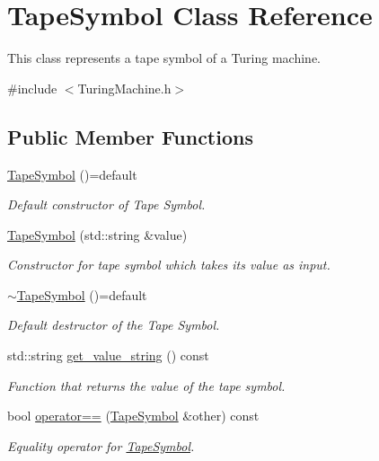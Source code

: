 \hypertarget{classTapeSymbol}{}\section{Tape\+Symbol Class Reference}
\label{classTapeSymbol}


This class represents a tape symbol of a Turing machine.  




{\ttfamily \#include $<$Turing\+Machine.\+h$>$}

\subsection*{Public Member Functions}
\begin{DoxyCompactItemize}
\item 
\mbox{\label{classTapeSymbol_a8b667065ca9dbb1840b6e5b940069214}} 
\hyperlink{classTapeSymbol_a8b667065ca9dbb1840b6e5b940069214}{Tape\+Symbol} ()=default
\begin{DoxyCompactList}\small\item\em Default constructor of Tape Symbol. \end{DoxyCompactList}\item 
\hyperlink{classTapeSymbol_ac4babc556460fd8d7da09115d9b19076}{Tape\+Symbol} (std\+::string \&value)
\begin{DoxyCompactList}\small\item\em Constructor for tape symbol which takes its value as input. \end{DoxyCompactList}\item 
\mbox{\label{classTapeSymbol_aa0474beea062da16777821736c788835}} 
\hyperlink{classTapeSymbol_aa0474beea062da16777821736c788835}{$\sim$\+Tape\+Symbol} ()=default
\begin{DoxyCompactList}\small\item\em Default destructor of the Tape Symbol. \end{DoxyCompactList}\item 
std\+::string \hyperlink{classTapeSymbol_a4f995f73db8026a4511cac0e7da6b66a}{get\+\_\+value\+\_\+string} () const
\begin{DoxyCompactList}\small\item\em Function that returns the value of the tape symbol. \end{DoxyCompactList}\item 
bool \hyperlink{classTapeSymbol_a4b36c3f7a3631d02d77c1eb2efa063a0}{operator==} (\hyperlink{classTapeSymbol}{Tape\+Symbol} \&other) const
\begin{DoxyCompactList}\small\item\em Equality operator for \hyperlink{classTapeSymbol}{Tape\+Symbol}. \end{DoxyCompactList}\end{DoxyCompactItemize}


